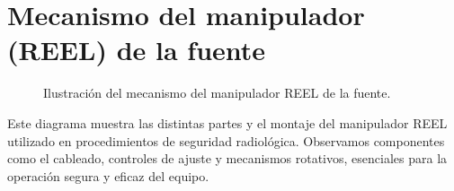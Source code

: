 \section*{Mecanismo del manipulador (REEL) de la fuente}

\begin{figure}[h]
    \centering
    \caption{Ilustración del mecanismo del manipulador REEL de la fuente.}
\end{figure}

Este diagrama muestra las distintas partes y el montaje del manipulador REEL utilizado en procedimientos de seguridad radiológica. Observamos componentes como el cableado, controles de ajuste y mecanismos rotativos, esenciales para la operación segura y eficaz del equipo.


\clearpage %
